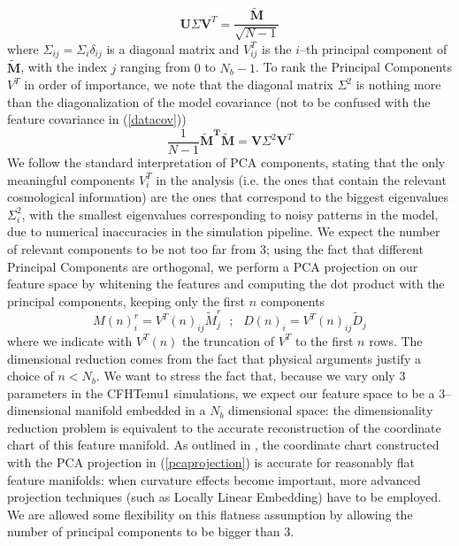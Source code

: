 \documentclass[reprint,aps,prd,superscriptaddress,showkeys,showpacs]{revtex4-1}
\begin{document}
\begin{equation}
\label{svd}
\mathbf{U}\Sigma \mathbf{V}^T=\frac{\mathbf{\tilde{M}}}{\sqrt{N-1}}
\end{equation}   
%
where $\Sigma_{ij}=\Sigma_i\delta_{ij}$ is a diagonal matrix and $V^T_{ij}$ is the $i$--th principal component of $\mathbf{\tilde{M}}$, with the index $j$ ranging from $0$ to $N_b-1$. To rank the Principal Components $V^T$ in order of importance, we note that the diagonal matrix $\Sigma^2$ is nothing more than the diagonalization of the model covariance (not to be confused with the feature covariance in (\ref{datacov}))
\begin{equation}
\frac{1}{N-1}\mathbf{\tilde{M}^T\tilde{M}} = \mathbf{V}\Sigma^2\mathbf{V}^T
\end{equation} 
%
We follow the standard interpretation of PCA components, stating that the only meaningful components $V^T_i$ in the analysis (i.e. the ones that contain the relevant cosmological information) are the ones that correspond to the biggest eigenvalues $\Sigma^2_{i}$, with the smallest eigenvalues corresponding to noisy patterns in the model, due to numerical inaccuracies in the simulation pipeline. We expect the number of relevant components to be not too far from 3; using the fact that different Principal Components are orthogonal, we perform a PCA projection on our feature space by whitening the features and computing the dot product with the principal components, keeping only the first $n$ components
\begin{equation}
\label{pcaprojection}
M(n)_{i}^r = V^T(n)_{ij}\tilde{M}_j^r \,\,\,\, ; \,\,\,\,  D(n)_i = V^T(n)_{ij}\tilde{D}_j
\end{equation}
%
where we indicate with $V^T(n)$ the truncation of $V^T$ to the first $n$ rows. The dimensional reduction comes from the fact that physical arguments justify a choice of $n< N_{b}$. We want to stress the fact that, because we vary only 3 parameters in the CFHTemu1 simulations, we expect our feature space to be a 3--dimensional manifold embedded in a $N_b$ dimensional space: the dimensionality reduction problem is equivalent to the accurate reconstruction of the coordinate chart of this feature manifold. As outlined in \citep{astroMLText}, the coordinate chart constructed with the PCA projection in (\ref{pcaprojection}) is accurate for reasonably flat feature manifolds: when curvature effects become important, more advanced projection techniques (such as Locally Linear Embedding) have to be employed. We are allowed some flexibility on this flatness assumption by allowing the number of principal components to be bigger than 3. 
\end{document}
